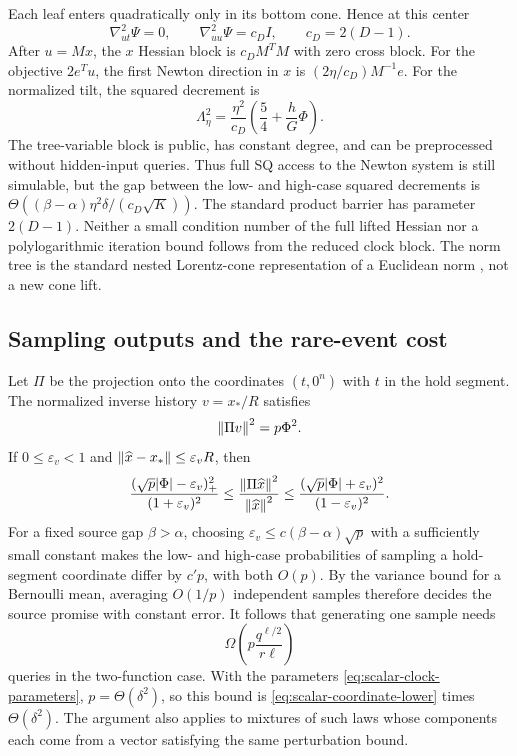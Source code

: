 Each leaf enters quadratically only in its bottom cone.  Hence at this
center
\[
 \nabla^2_{ut}\Psi=0,\qquad
 \nabla^2_{uu}\Psi=c_DI,\qquad c_D=2(D-1).
\]
After $u=Mx$, the $x$ Hessian block is $c_DM^TM$ with zero cross block.
For the objective $2e^Tu$, the first Newton direction in $x$ is
$(2\eta/c_D)M^{-1}e$.  For the normalized tilt, the squared decrement is
\begin{equation}\label{eq:tree-decrement}
 \Lambda_\eta^2=\frac{\eta^2}{c_D}
        \left(\frac54+\frac hG\Phi\right).
\end{equation}
The tree-variable block is public, has constant degree, and can be
preprocessed without hidden-input queries.  Thus full SQ access to the Newton
system is still simulable, but the gap between the low- and high-case
squared decrements is
$\Theta((\beta-\alpha)\eta^2\delta/(c_D\sqrt K))$.
The standard product barrier has parameter $2(D-1)$.
Neither a small condition number of the full lifted Hessian nor a
polylogarithmic iteration bound follows from the reduced clock block.
The norm tree is the standard nested Lorentz-cone representation of a
Euclidean norm \citep{AlizadehGoldfarb2003}, not a new cone lift.

\subsection{Sampling outputs and the rare-event cost}\label{subsec:cyclic-sampling}

Let $\Pi$ be the projection onto the coordinates $(t,0^n)$ with
$t$ in the hold segment.  The normalized
inverse history $v=x_*/R$ satisfies
\begin{equation}\label{eq:history-projector}
 \left\lVert\Pi v\right\rVert^2=p\Phi^2.
\end{equation}
If $0\leq\varepsilon_v<1$ and
$\left\lVert\widehat x-x_*\right\rVert\leq\varepsilon_v R$, then
\[
 \frac{(\sqrt p|\Phi|-\varepsilon_v)_+^2}{(1+\varepsilon_v)^2}
 \leq\frac{\left\lVert\Pi\widehat x\right\rVert^2}{\left\lVert\widehat x\right\rVert^2}
 \leq\frac{(\sqrt p|\Phi|+\varepsilon_v)^2}{(1-\varepsilon_v)^2}.
\]
For a fixed source gap $\beta>\alpha$, choosing
$\varepsilon_v\leq c(\beta-\alpha)\sqrt p$ with a sufficiently small
constant makes the low- and high-case probabilities of sampling a
hold-segment coordinate differ by $c' p$, with both $O(p)$.  By the variance bound for a Bernoulli mean,
averaging $O(1/p)$ independent samples therefore decides the source
promise with constant error.  It follows that generating one sample needs
\begin{equation}\label{eq:rare-sampling-lower}
 \Omega\left(p\frac{q^{\ell/2}}{r\ell}\right)
\end{equation}
queries in the two-function case.  With the parameters
\eqref{eq:scalar-clock-parameters}, $p=\Theta(\delta^2)$, so this bound
is \eqref{eq:scalar-coordinate-lower} times $\Theta(\delta^2)$.
The argument also applies to mixtures of such laws whose components each
come from a vector satisfying the same perturbation bound.

